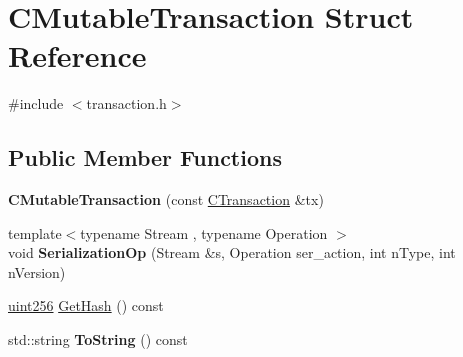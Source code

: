 \hypertarget{struct_c_mutable_transaction}{}\section{C\+Mutable\+Transaction Struct Reference}
\label{struct_c_mutable_transaction}


{\ttfamily \#include $<$transaction.\+h$>$}

\subsection*{Public Member Functions}
\begin{DoxyCompactItemize}
\item 
\mbox{\label{struct_c_mutable_transaction_abb693b3e8d26fa6ecabc93d0f089e995}} 
{\bfseries C\+Mutable\+Transaction} (const \mbox{\hyperlink{class_c_transaction}{C\+Transaction}} \&tx)
\item 
\mbox{\label{struct_c_mutable_transaction_a31e7420656b9a31ca6ea44095ce726d9}} 
{\footnotesize template$<$typename Stream , typename Operation $>$ }\\void {\bfseries Serialization\+Op} (Stream \&s, Operation ser\+\_\+action, int n\+Type, int n\+Version)
\item 
\mbox{\hyperlink{classuint256}{uint256}} \mbox{\hyperlink{struct_c_mutable_transaction_a52799a4ca4831f56532c1c0bcb110721}{Get\+Hash}} () const
\item 
\mbox{\label{struct_c_mutable_transaction_a817e6be6ddc9f1abb74e572d04a061d8}} 
std\+::string {\bfseries To\+String} () const
\end{DoxyCompactItemize}
